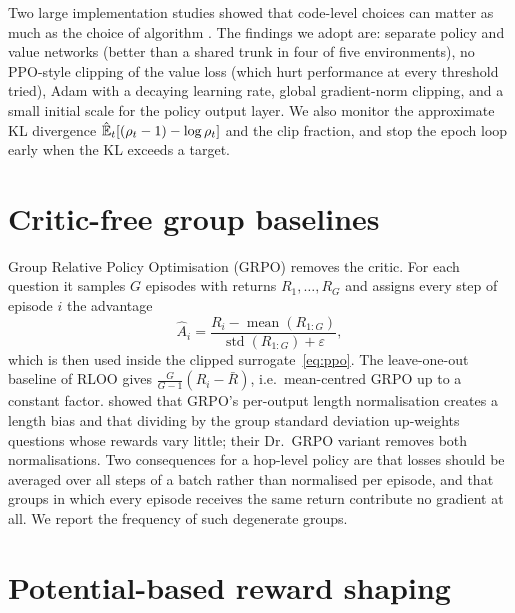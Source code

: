 Two large implementation studies showed that code-level choices can matter as much as the choice of algorithm \citep{engstrom2020implementation,andrychowicz2021matters}. The findings we adopt are: separate policy and value networks (better than a shared trunk in four of five environments), no PPO-style clipping of the value loss (which hurt performance at every threshold tried), Adam with a decaying learning rate, global gradient-norm clipping, and a small initial scale for the policy output layer. We also monitor the approximate KL divergence $\hat{\mathbb{E}}_t[(\rho_t-1)-\log\rho_t]$ and the clip fraction, and stop the epoch loop early when the KL exceeds a target.

\section{Critic-free group baselines}

Group Relative Policy Optimisation (GRPO) \citep{shao2024deepseekmath} removes the critic. For each question it samples $G$ episodes with returns $R_1,\dots,R_G$ and assigns every step of episode $i$ the advantage
\begin{equation}
  \hat A_i=\frac{R_i-\operatorname{mean}(R_{1:G})}{\operatorname{std}(R_{1:G})+\varepsilon},
  \label{eq:grpo}
\end{equation}
which is then used inside the clipped surrogate~\eqref{eq:ppo}. The leave-one-out baseline of RLOO \citep{ahmadian-etal-2024-back} gives $\frac{G}{G-1}(R_i-\bar R)$, i.e.\ mean-centred GRPO up to a constant factor. \citet{liu2025understanding} showed that GRPO's per-output length normalisation creates a length bias and that dividing by the group standard deviation up-weights questions whose rewards vary little; their Dr.~GRPO variant removes both normalisations. Two consequences for a hop-level policy are that losses should be averaged over all steps of a batch rather than normalised per episode, and that groups in which every episode receives the same return contribute no gradient at all. We report the frequency of such degenerate groups.

\section{Potential-based reward shaping}

